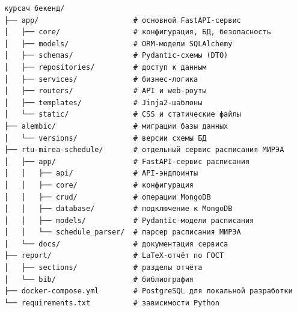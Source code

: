 \begin{verbatim}
курсач бекенд/
├── app/                      # основной FastAPI-сервис
│   ├── core/                 # конфигурация, БД, безопасность
│   ├── models/               # ORM-модели SQLAlchemy
│   ├── schemas/              # Pydantic-схемы (DTO)
│   ├── repositories/         # доступ к данным
│   ├── services/             # бизнес-логика
│   ├── routers/              # API и web-роуты
│   ├── templates/            # Jinja2-шаблоны
│   └── static/               # CSS и статические файлы
├── alembic/                  # миграции базы данных
│   └── versions/             # версии схемы БД
├── rtu-mirea-schedule/       # отдельный сервис расписания МИРЭА
│   ├── app/                  # FastAPI-сервис расписания
│   │   ├── api/              # API-эндпоинты
│   │   ├── core/             # конфигурация
│   │   ├── crud/             # операции MongoDB
│   │   ├── database/         # подключение к MongoDB
│   │   ├── models/           # Pydantic-модели расписания
│   │   └── schedule_parser/  # парсер расписания МИРЭА
│   └── docs/                 # документация сервиса
├── report/                   # LaTeX-отчёт по ГОСТ
│   ├── sections/             # разделы отчёта
│   └── bib/                  # библиография
├── docker-compose.yml        # PostgreSQL для локальной разработки
└── requirements.txt          # зависимости Python
\end{verbatim}
